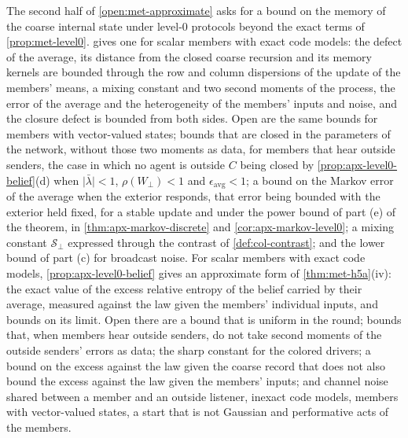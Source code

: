 \begin{openproblem}\label{open:apx-internal}
The second half of \cref{open:met-approximate} asks for a bound on the memory of the coarse internal state under level-0 protocols beyond the exact terms of \cref{prop:met-level0}.  gives one for scalar members with exact code models: the defect of the average, its distance from the closed coarse recursion and its memory kernels are bounded through the row and column dispersions of the update of the members' means, a mixing constant and two second moments of the process, the error of the average and the heterogeneity of the members' inputs and noise, and the closure defect is bounded from both sides. Open are the same bounds for members with vector-valued states; bounds that are closed in the parameters of the network, without those two moments as data, for members that hear outside senders, the case in which no agent is outside $C$ being closed by \cref{prop:apx-level0-belief}(d) when $\lvert\bar\lambda\rvert<1$, $\rho(W_\perp)<1$ and $\epsilon_{\mathrm{avg}}<1$; a bound on the Markov error of the average when the exterior responds, that error being bounded with the exterior held fixed, for a stable update and under the power bound of part (e) of the theorem, in \cref{thm:apx-markov-discrete} and \cref{cor:apx-markov-level0}; a mixing constant $\mathcal S_\perp$ expressed through the contrast of \cref{def:col-contrast}; and the lower bound of part (c) for broadcast noise. For scalar members with exact code models, \cref{prop:apx-level0-belief} gives an approximate form of \cref{thm:met-h5a}(iv): the exact value of the excess relative entropy of the belief carried by their average, measured against the law given the members' individual inputs, and bounds on its limit. Open there are a bound that is uniform in the round; bounds that, when members hear outside senders, do not take second moments of the outside senders' errors as data; the sharp constant for the colored drivers; a bound on the excess against the law given the coarse record that does not also bound the excess against the law given the members' inputs; and channel noise shared between a member and an outside listener, inexact code models, members with vector-valued states, a start that is not Gaussian and performative acts of the members.
\end{openproblem}

